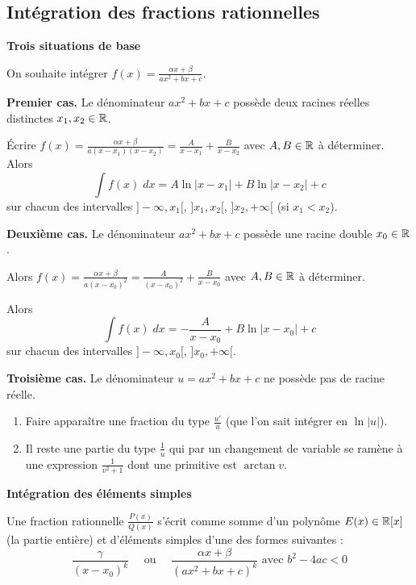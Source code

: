\documentclass[10pt,class=article,crop=false]{standalone}
\begin{document}
\begin{multicols}{2}
\subsection{Intégration des fractions rationnelles}



\textbf{Trois situations de base}

On souhaite intégrer $f(x)=\frac{\alpha x + \beta}{a x^2+b x+c}$.

\textbf{Premier cas.} Le dénominateur $a x^2+b x+c$ possède deux racines réelles distinctes $x_1,x_ 2\in \mathbb{R}$.


Écrire 
$f(x)
= \frac{\alpha x + \beta}{a(x - x_1)(x - x_2)} 
= \frac{A}{x - x_1}+\frac{B}{x -x_2}$ avec $A,B \in \mathbb{R}$ à déterminer. 
Alors 
$$\int f(x)\;dx = A \ln|x - x_1|+B\ln|x -x_2|+c$$
sur chacun des intervalles
$]-\infty,x_1[$, $]x_1,x_2[$, $]x_2,+\infty[$ (si $x_1<x_2$).


\textbf{Deuxième cas.} Le dénominateur $a x^2+b x+c$ possède une racine double $x_0 \in \mathbb{R}$.


Alors 
$f(x)
= \frac{\alpha x + \beta}{a(x -x_0)^2}
= \frac{A}{(x - x_0)^2}+\frac{B}{x - x_0}$ avec $A,B \in \mathbb{R}$ à déterminer. 

Alors
$$\int f(x)\;dx = -\frac{A}{x - x_0} + B\ln|x - x_0|+c$$
sur chacun des intervalles
$]-\infty,x_0[$, $]x_0,+\infty[$.


\textbf{Troisième cas.}  Le dénominateur $u = a x^2+b x+c$ ne possède pas de racine réelle.

\begin{enumerate}
	\item Faire apparaître une fraction du type $\frac{u'}{u}$
	(que l'on sait intégrer en $\ln|u|$).
	
    \item Il reste une partie du type $\frac{1}{u}$ qui par un changement de variable se ramène à une expression $\frac{1}{v^2+1}$ dont une primitive est $\arctan v$.
\end{enumerate}


\textbf{Intégration des éléments simples}

Une fraction rationnelle $\frac{P(x)}{Q(x)}$ s'écrit comme somme d'un polynôme $E(x) \in \mathbb{R}[x]$ (la partie entière)
et d'éléments simples d'une des formes suivantes :
$$\frac{\gamma}{(x - x_0)^k} \quad \text{ ou } \quad \frac{\alpha x+\beta}{(a x^2+b x+c)^k} \text{ avec } b^2-4ac < 0$$


\end{multicols}
\end{document}
